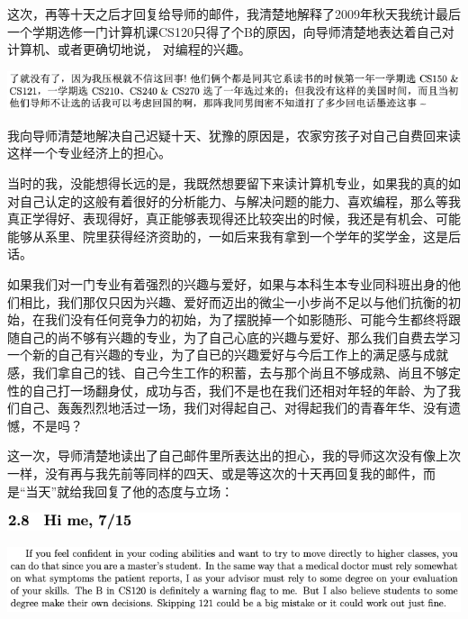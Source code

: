 \documentclass[9pt, b5paper]{article}
\begin{document}
这次，再等十天之后才回复给导师的邮件，我清楚地解释了2009年秋天我统计最后一个学期选修一门计算机课CS120只得了个B的原因，向导师清楚地表达着自己对计算机、或者更确切地说，
对编程的兴趣。

\begin{center}
\includegraphics[width=.9\linewidth]{./pic/backups_plans_20210421_134255.png}
\end{center}

我向导师清楚地解决自己迟疑十天、犹豫的原因是，农家穷孩子对自己自费回来读这样一个专业经济上的担心。

当时的我，没能想得长远的是，我既然想要留下来读计算机专业，如果我的真的如对自己认定的这般有着很好的分析能力、与解决问题的能力、喜欢编程，那么等我真正学得好、表现得好，真正能够表现得还比较突出的时候，我还是有机会、可能能够从系里、院里获得经济资助的，一如后来我有拿到一个学年的奖学金，这是后话。 

如果我们对一门专业有着强烈的兴趣与爱好，如果与本科生本专业同科班出身的他们相比，我们那仅只因为兴趣、爱好而迈出的微尘一小步尚不足以与他们抗衡的初始，在我们没有任何竞争力的初始，为了摆脱掉一个如影随形、可能今生都终将跟随自己的尚不够有兴趣的专业，为了自己心底的兴趣与爱好、那么我们自费去学习一个新的自己有兴趣的专业，为了自已的兴趣爱好与今后工作上的满足感与成就感，我们拿自己的钱、自己今生工作的积蓄，去与那个尚且不够成熟、尚且不够定性的自己打一场翻身仗，成功与否，我们不是也在我们还相对年轻的年龄、为了我们自己、轰轰烈烈地活过一场，我们对得起自己、对得起我们的青春年华、没有遗憾，不是吗？

这一次，导师清楚地读出了自己邮件里所表达出的担心，我的导师这次没有像上次一样，没有再与我先前等同样的四天、或是等这次的十天再回复我的邮件，而是“当天”就给我回复了他的态度与立场：

\begin{center}
\includegraphics[width=.9\linewidth]{./pic/backups_plans_20210421_093907.png}
\end{center}

\begin{center}
\includegraphics[width=.9\linewidth]{./pic/backups_plans_20210419_085846.png}
\end{center}
\end{document}

